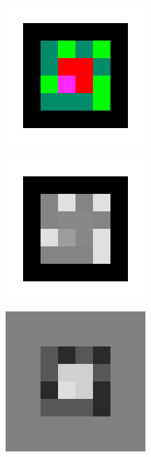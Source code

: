 \clearpage
\begin{figure}[htb]
	\begin{minipage}[t]{0.5\linewidth}
		\centering
		\includegraphics[width=0.7\columnwidth]{figures/2-11a.png} 
		\label{fig:2-11a} 
	\end{minipage}
	\begin{minipage}[t]{0.5\linewidth} 
		\centering
		\includegraphics[width=0.7\columnwidth]{figures/2-11b.png} 
		\label{fig:2-11b} 
	\end{minipage}
	\begin{minipage}[t]{0.5\linewidth} 
		\centering
		\includegraphics[width=0.7\columnwidth]{figures/2-11c.png} 

\end{minipage}
\end{figure}
